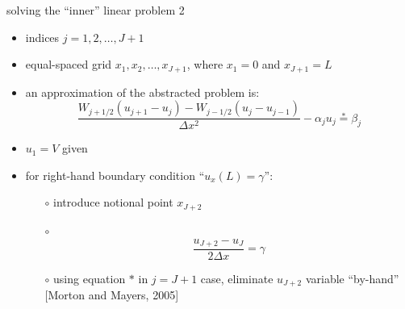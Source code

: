 \begin{frame}{solving the ``inner'' linear problem 2}

\begin{itemize}
\item indices $j=1,2,\dots,J+1$
\item equal-spaced grid $x_1,x_2,\dots,x_{J+1}$, where $x_1 = 0$ and $x_{J+1} = L$
\item an approximation of the abstracted problem is:
$$\frac{W_{j+1/2} (u_{j+1} - u_j) - W_{j-1/2} (u_{j} - u_{j-1})}{\Delta x^2} - \alpha_j u_j \stackrel{\ast}{=} \beta_j$$
\item $u_1 = V$ given
\item for right-hand boundary condition ``$u_x(L)=\gamma$'':
  \begin{itemize}
  \item[$\circ$] introduce notional point $x_{J+2}$
  \item[$\circ$]
    $$\frac{u_{J+2} - u_J}{2 \Delta x} = \gamma$$
  \item[$\circ$] using equation $\ast$ in $j=J+1$ case, eliminate $u_{J+2}$ variable ``by-hand'' [Morton and Mayers, 2005]\nocite{MortonMayers}
  \end{itemize}
\end{itemize}
\end{frame}


